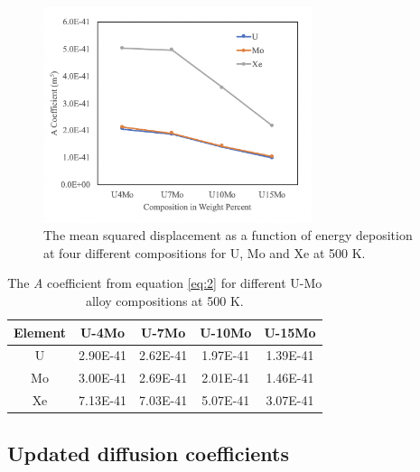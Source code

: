 \documentclass[review]{elsarticle}
\begin{document}
\begin{figure}[h]
 \centering
 \includegraphics[width=0.7\textwidth]{7_A_comp.png} 
 \caption{The mean squared displacement as a function of energy deposition at four different compositions for U, Mo and Xe at 500 K.}
 \label{fig:A_comp}
\end{figure}

\begin{table}[h!]
\caption{The \textit{A} coefficient from equation \ref{eq:2} for different U-Mo alloy compositions at 500 K. }
\label{tab1}
\begin{center}
\begin{tabular}{|c|c|c|c|c|}
\hline
Element & U-4Mo & U-7Mo & U-10Mo & U-15Mo \\
\hline
U & 2.90E-41 & 2.62E-41 & 1.97E-41 & 1.39E-41 \\
Mo & 3.00E-41 & 2.69E-41 & 2.01E-41 & 1.46E-41 \\
Xe & 7.13E-41 & 7.03E-41 & 5.07E-41 & 3.07E-41 \\
 \hline
\end{tabular}
\end{center}
\label{default}
\end{table}%


\subsection{Updated diffusion coefficients}
\end{document}

